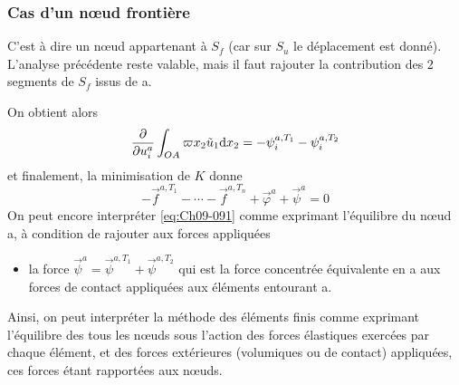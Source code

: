 \subsubsection{Cas d'un nœud frontière}
C'est à dire un nœud appartenant à $S_f$ (car sur $S_u$ le déplacement est donné).
L'analyse précédente reste valable, mais il faut rajouter la contribution des 2 segments de $S_f$ issus de a.

On obtient alors 
\begin{equation}
    \frac{\partial}{\partial u_i^a} \int_{OA} \varpi x_2 \tilde{u}_1 \mathrm{d} x_2 = - \psi_i^{a,T_1} - \psi_i^{a,T_2}
    \label{eq:Ch09-090}
\end{equation}
et finalement, la minimisation de $K$ donne 
\begin{equation}
    -\vec{f}^{a,T_1} - \cdots -\vec{f}^{a,T_n} + \vec{\varphi}^a + \vec{\psi}^a = 0 
    \label{eq:Ch09-091}
\end{equation}
On peut encore interpréter \eqref{eq:Ch09-091} comme exprimant l'équilibre du nœud a, à condition de rajouter aux forces appliquées
\begin{itemize}
    \item la force $\vec{\psi}^a = \vec{\psi}^{a,T_1}+ \vec{\psi}^{a,T_2}$ qui est la force concentrée équivalente en a aux forces de contact appliquées aux éléments entourant a. 
\end{itemize}

Ainsi, on peut interpréter la méthode des éléments finis comme exprimant l'équilibre des tous les nœuds sous l'action des forces élastiques exercées par chaque élément, et des forces extérieures (volumiques ou de contact) appliquées, ces forces étant rapportées aux nœuds. 

